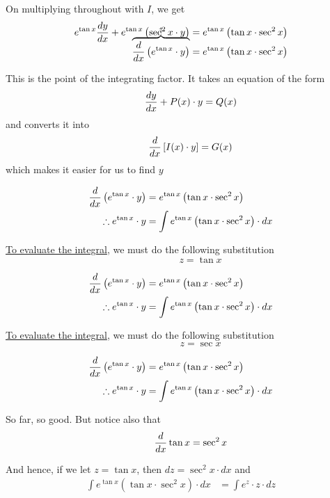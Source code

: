\documentclass[14pt,fleqn]{extarticle}
\newcommand\intgf{e^{\tan x}}
\newcommand\expa{\tan x\cdot\sec^2 x}
\begin{document}
\begin{question}
\begin{step}
On multiplying throughout with $I$, we get 
\smallmath\begin{align}
\intgf \dydx + \intgf \left(\sec^2x \cdot y \right) &= \intgf \left(\expa \right) \\[-20pt]
\overbrace{\ddx \left(\intgf\cdot y \right)}^{\uparrow} &= \intgf \left(\expa \right)
\end{align}

This is the point of the integrating factor. It takes an equation of the form 
\[ \qquad \frac{dy}{dx} + P(x)\cdot y = Q(x) \]
and converts it into 
\[ \qquad \frac{d}{dx} \left[I(x)\cdot y \right] = G(x) \]
which makes it easier for us to find $y$ 
\end{step}

\begin{step}
  \begin{options} 
     \correct 
       
       \begin{align}
	\ddx \left(\intgf \cdot y \right) &= \intgf \left(\expa \right) \\
	\therefore \intgf\cdot y &= \int \intgf \left(\expa \right)\cdot dx 
\end{align}

\underline{To evaluate the integral}, we must do the following substitution 
\[ \qquad \qquad z = \tan x \]

     \incorrect
     
     \begin{align}
	\ddx \left(\intgf \cdot y \right) &= \intgf \left(\expa \right) \\
	\therefore \intgf\cdot y &= \int \intgf \left(\expa \right)\cdot dx 
\end{align}

\underline{To evaluate the integral}, we must do the following substitution 
\[ \qquad \qquad z = \sec x \]
        
    \end{options} 
     \reason 
     
     \begin{align}
	\ddx \left(\intgf \cdot y \right) &= \intgf \left(\expa \right) \\
	\therefore \intgf\cdot y &= \int \intgf \left(\expa \right)\cdot dx 
\end{align}

So far, so good. But notice also that 
\[ \qquad \frac{d}{dx} \tan x = \sec^2 x\]

And hence, if we let $z = \tan x$, then $dz = \sec^2x\cdot dx$ and 
\begin{align}
\int \intgf \left(\expa \right)\cdot dx &= \int e^z\cdot z \cdot dz 
\end{align}
       

\end{step}
\end{question}
\end{document}

